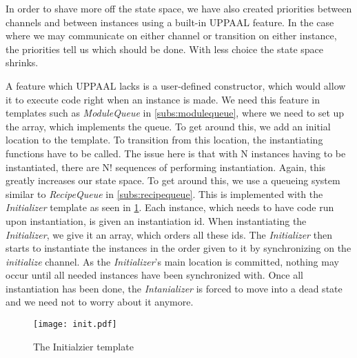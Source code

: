 In order to shave more off the state space, we have also created priorities between channels and between instances using a built-in UPPAAL feature. In the case where we may communicate on either channel or transition on either instance, the priorities tell us which should be done. With less choice the state space shrinks.

A feature which UPPAAL lacks is a user-defined constructor, which would allow it to execute code right when an instance is made. We need this feature in templates such as \emph{ModuleQueue} in \cref{subs:modulequeue}, where we need to set up the array, which implements the queue. To get around this, we add an initial location to the template. To transition from this location, the instantiating functions have to be called. The issue here is that with N instances having to be instantiated, there are N! sequences of performing instantiation. Again, this greatly increases our state space. To get around this, we use a queueing system similar to \emph{RecipeQueue} in \cref{subs:recipequeue}. This is implemented with the \emph{Initializer} template as seen in \cref{fig:initializer}. Each instance, which needs to have code run upon instantiation, is given an instantiation id. When instantiating the \emph{Initializer}, we give it an array, which orders all these ids. The \emph{Initializer} then starts to instantiate the instances in the order given to it by synchronizing on the \emph{initialize} channel. As the \emph{Initializer}'s main location is committed, nothing may occur until all needed instances have been synchronized with. Once all instantiation has been done, the \emph{Intanializer} is forced to move into a dead state and we need not to worry about it anymore.    

\begin{figure}[h]
\centering
\texttt{[image: init.pdf]}
\caption{The Initialzier template}
\label{fig:initializer}
\end{figure}

